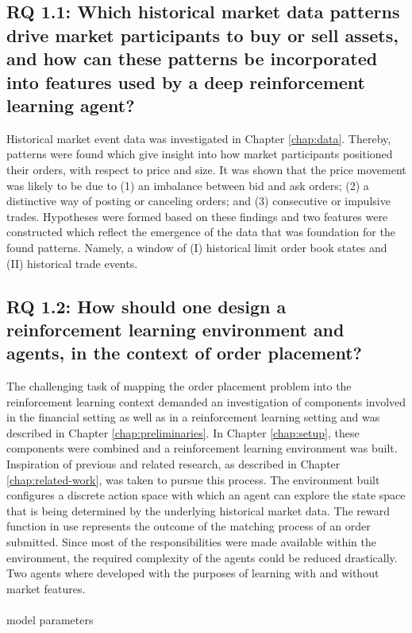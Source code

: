 \subsection{RQ 1.1: Which historical market data patterns drive market participants to buy or sell assets, and how can these patterns be incorporated into features used by a deep reinforcement learning agent?}

    Historical market event data was investigated in Chapter \ref{chap:data}. 
    Thereby, patterns were found which give insight into how market participants positioned their orders, with respect to price and size. 
    It was shown that the price movement was likely to be due to (1) an imbalance between bid and ask orders; (2) a distinctive way of posting or canceling orders; and (3) consecutive or impulsive trades.
    Hypotheses were formed based on these findings and two features were constructed which reflect the emergence of the data that was foundation for the found patterns.
    Namely, a window of (I) historical limit order book states and (II) historical trade events.

\subsection{RQ 1.2: How should one design a reinforcement learning environment and agents, in the context of order placement?}

    The challenging task of mapping the order placement problem into the reinforcement learning context demanded an investigation of components involved in the financial setting as well as in a reinforcement learning setting and was described in Chapter \ref{chap:preliminaries}.
    In Chapter \ref{chap:setup}, these components were combined and a reinforcement learning environment was built.
    Inspiration of previous and related research, as described in Chapter \ref{chap:related-work}, was taken to pursue this process.
    The environment built configures a discrete action space with which an agent can explore the state space that is being determined by the underlying historical market data.
    The reward function in use represents the outcome of the matching process of an order submitted.
    Since most of the responsibilities were made available within the environment, the required complexity of the agents could be reduced drastically.
    Two agents where developed with the purposes of learning with and without market features.
    \\
    \\
            model parameters
            
